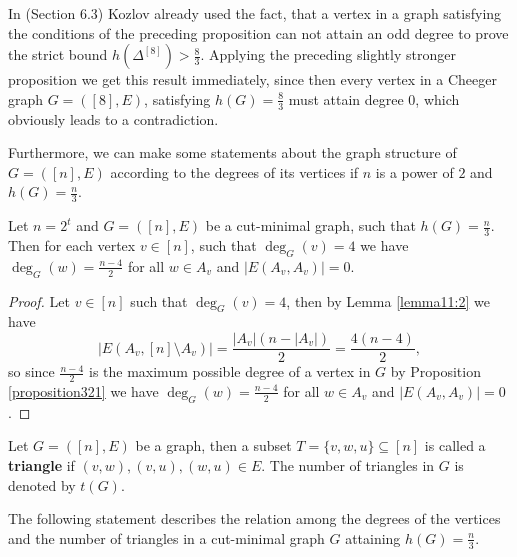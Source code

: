 \begin{expl}
In \cite{1} (Section 6.3) Kozlov already used the fact, that a vertex in a graph satisfying the conditions of the preceding proposition can not attain an odd degree to prove the strict bound \(h(\Delta^{[8]})>\frac{8}{3}\). Applying the preceding slightly stronger proposition we get this result immediately, since then every vertex in a Cheeger graph \(G=([8],E)\), satisfying \(h(G)=\frac{8}{3}\) must attain degree \(0\), which obviously leads to a contradiction.
\end{expl}

Furthermore, we can make some statements about the graph structure of \(G=([n],E)\) according to the degrees of its vertices if \(n\) is a power of \(2\) and \(h(G)=\frac{n}{3}\).

\begin{lem}\label{lemma362}
Let \(n=2^t\) and \(G=([n],E)\) be a cut-minimal graph, such that \(h(G)=\frac{n}{3}\). Then for each vertex \(v\in [n]\), such that \(\deg_G(v)=4\) we have \(\deg_G(w)=\frac{n-4}{2}\) for all \(w\in A_v\) and \(|E(A_v,A_v)|=0\).
\begin{proof}
Let \(v\in [n]\) such that \(\deg_G(v)=4\), then by Lemma \ref{lemma11:2} we have
\[
|E(A_v,[n]\setminus A_v)|=\frac{|A_v|(n-|A_v|)}{2}=\frac{4(n-4)}{2},
\]
so since \(\frac{n-4}{2}\) is the maximum possible degree of a vertex in \(G\) by Proposition \ref{proposition321} we have \(\deg_G(w)=\frac{n-4}{2}\) for all \(w\in A_v\) and \(|E(A_v,A_v)|=0\).
\end{proof}
\end{lem}

\begin{defi}
Let \(G=([n],E)\) be a graph, then a subset \(T=\{v,w,u\}\subseteq [n]\) is called a \textbf{triangle} if \((v,w),(v,u),(w,u)\in E\). The number of triangles in \(G\) is denoted by \(t(G)\).
\end{defi}

The following statement describes the relation among the degrees of the vertices and the number of triangles in a cut-minimal graph \(G\) attaining \(h(G)=\frac{n}{3}\).

